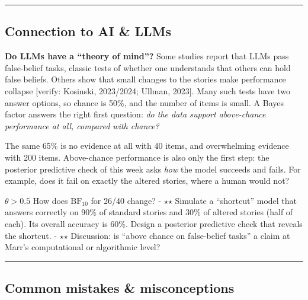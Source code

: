 \begin{center}\rule{0.5\linewidth}{0.5pt}\end{center}

\subsection{Connection to AI \& LLMs}

\textbf{Do LLMs have a ``theory of mind''?} Some studies report that
LLMs pass false-belief tasks, classic tests of whether one understands
that others can hold false beliefs. Others show that small changes to
the stories make performance collapse {[}verify: Kosinski, 2023/2024;
Ullman, 2023{]}. Many such tests have two answer options, so chance is
50\%, and the number of items is small. A Bayes factor answers the right
first question: \emph{do the data support above-chance performance at
all, compared with chance?}

The same 65\% is no evidence at all with 40 items, and overwhelming
evidence with 200 items. Above-chance performance is also only the first
step: the posterior predictive check of this week asks \emph{how} the
model succeeds and fails. For example, does it fail on exactly the
altered stories, where a human would not?

\(\theta > 0.5\) How does \(\mathrm{BF}_{10}\) for 26/40 change? - \ensuremath{\star}\ensuremath{\star}
Simulate a ``shortcut'' model that answers correctly on 90\% of standard
stories and 30\% of altered stories (half of each). Its overall accuracy
is 60\%. Design a posterior predictive check that reveals the shortcut.
- \ensuremath{\star}\ensuremath{\star} Discussion: is ``above chance on false-belief tasks'' a claim at
Marr's computational or algorithmic level?

\begin{center}\rule{0.5\linewidth}{0.5pt}\end{center}

\subsection{Common mistakes \& misconceptions}

